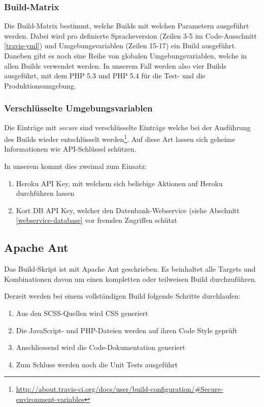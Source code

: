 \subsubsection{Build-Matrix}
Die Build-Matrix bestimmt, welche Builds mit welchen Parametern ausgeführt werden.
Dabei wird pro definierte Spracheversion (Zeilen 3-5 im Code-Ausschnitt \ref{travis-yml}) und Umgebungsvariablen (Zeilen 15-17) ein Build ausgeführt.
Daneben gibt es noch eine Reihe von globalen Umgebungsvariablen, welche in allen Builds verwendet werden.
In unserem Fall werden also vier Builds ausgeführt, mit dem PHP 5.3 und PHP 5.4 für die Test- und die Produktionsumgebung.

\subsubsection{Verschlüsselte Umgebungsvariablen}
Die Einträge mit \emph{secure} sind verschlüsselte Einträge welche bei der Ausführung des Builds wieder entschlüsselt werden\footnote{\url{http://about.travis-ci.org/docs/user/build-configuration/\#Secure-environment-variables}}.
Auf diese Art lassen sich geheime Informationen wie API-Schlüssel schützen.

In unserem  kommt dies zweimal zum Einsatz:
\begin{enumerate}
\item Heroku API Key, mit welchem sich beliebige Aktionen auf Heroku durchführen lassen
\item Kort DB API Key, welcher den Datenbank-Webservice (siehe Abschnitt \ref{webservice-database} vor fremden Zugriffen schützt
\end{enumerate}

\subsection{Apache Ant}
Das Build-Skript ist mit Apache Ant geschrieben.
Es beinhaltet alle Targets und Kombinationen davon um einen kompletten oder teilweisen Build durchzuführen.

Derzeit werden bei einem vollständigen Build folgende Schritte durchlaufen:
\begin{enumerate}
\item Aus den SCSS-Quellen wird CSS generiert
\item Die JavaScript- und PHP-Dateien werden auf ihren Code Style geprüft
\item Anschliessend wird die Code-Dokumentation generiert
\item Zum Schluss werden noch die Unit Tests ausgeführt
\end{enumerate}

